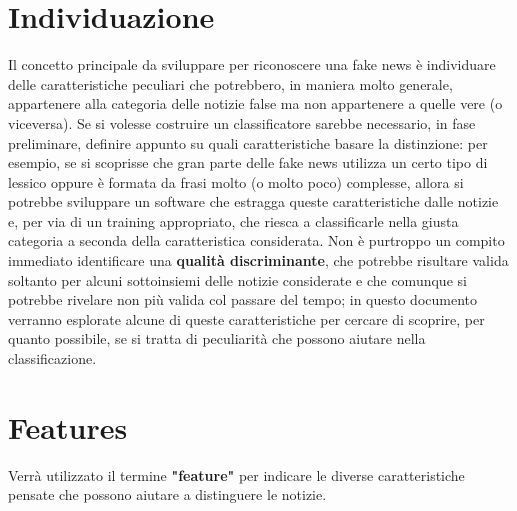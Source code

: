 \documentclass{article}
\begin{document}
		
		
	    \newpage
	    
    \begin{multicols}{2}
			\section{Individuazione}
			Il concetto principale da sviluppare per riconoscere una fake news è individuare delle caratteristiche peculiari che potrebbero, in maniera molto generale, appartenere alla categoria delle notizie false ma non appartenere a quelle vere (o viceversa). Se si volesse costruire un classificatore sarebbe necessario, in fase preliminare, definire appunto su quali caratteristiche basare la distinzione: per esempio, se si scoprisse che gran parte delle fake news utilizza un certo tipo di lessico oppure è formata da frasi molto (o molto poco) complesse, allora si potrebbe sviluppare un software che estragga queste caratteristiche dalle notizie e, per via di un training appropriato, che riesca a classificarle nella giusta categoria a seconda della caratteristica considerata.
			Non è purtroppo un compito immediato identificare una \textbf{qualità discriminante}, che potrebbe risultare valida soltanto per alcuni sottoinsiemi delle notizie considerate e che comunque si potrebbe rivelare non più valida col passare del tempo; in questo documento verranno esplorate alcune di queste caratteristiche per cercare di scoprire, per quanto possibile, se si tratta di peculiarità che possono aiutare nella classificazione.
	    
	    \section{Features}
		    Verrà utilizzato il termine \textbf{"feature"} per indicare le diverse caratteristiche pensate che possono aiutare a distinguere le notizie.
		    

\end{multicols}
\end{document}
